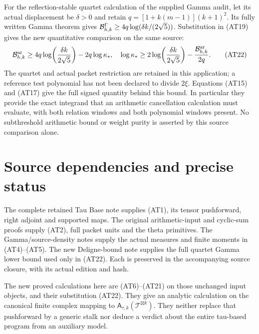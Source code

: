 For the reflection-stable quartet calculation of the supplied
Gamma audit, let its actual displacement be $\delta>0$ and
retain $q=[1+k(m-1)](k+1)^2$. Its fully written Gamma theorem
gives $\mathcal B^\Gamma_{h,k}\ge
4q\log(\delta k/(2\sqrt5))$. Substitution in (AT19) gives the
new quantitative comparison on the same source:
\[
 \mathcal B^{\mathrm{ar}}_{h,k}\ge
 4q\log\!\left(\frac{\delta k}{2\sqrt5}\right)-2q\log\kappa_*,
 \quad
 \log\kappa_*\ge
 2\log\!\left(\frac{\delta k}{2\sqrt5}\right)
       -\frac{\mathcal B^{\mathrm{ar}}_{h,k}}{2q}.                   \tag{AT22}
\]
The quartet and actual packet restriction are retained in this
application; a reference test polynomial has not been declared
to divide $2\xi$. Equations (AT15) and (AT17) give the full
signed quantity behind this bound. In particular they provide
the exact integrand that an arithmetic cancellation calculation
must evaluate, with both relation windows and both polynomial
windows present. No subthreshold arithmetic bound or weight
purity is asserted by this source comparison alone.

\section{Source dependencies and precise status}

The complete retained Tau Base note supplies (AT1), its tensor
pushforward, right adjoint and supported maps. The original
arithmetic-input and cyclic-sum proofs supply (AT2), full packet
units and the theta primitives. The Gamma/source-density notes
supply the actual measures and finite moments in (AT4)--(AT5).
The new Deligne-bound note supplies the full quartet Gamma
lower bound used only in (AT22). Each is preserved in the
accompanying source closure, with its actual edition and hash.

The new proved calculations here are (AT6)--(AT21) on those
unchanged input objects, and their substitution (AT22). They
give an analytic calculation on the canonical finite complex
mapping to $\mathsf A_{\tau,k}(\mathcal T^{\boxtimes k})$.
They neither replace that pushforward by a generic stalk nor
deduce a verdict about the entire tau-based program from an
auxiliary model.

